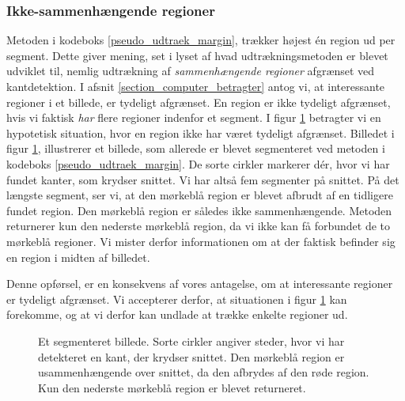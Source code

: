 {\subsubsection{Ikke-sammenhængende regioner}
Metoden i kodeboks \ref{pseudo_udtraek_margin}, trækker højest én region
ud per segment. Dette giver mening, set i lyset af hvad
udtrækningsmetoden er blevet udviklet til, nemlig udtrækning af
\emph{sammenhængende regioner} afgrænset ved kantdetektion. I afsnit
\ref{section_computer_betragter} antog vi, at interessante regioner i et
billede, er tydeligt afgrænset. En region er ikke tydeligt afgrænset,
hvis vi faktisk \emph{har} flere regioner indenfor et segment. I figur
\ref{usammenhaengende_region} betragter vi en hypotetisk situation, hvor
en region ikke har været tydeligt afgrænset. Billedet i figur
\ref{usammenhaengende_region}, illustrerer et billede, som allerede er
blevet segmenteret ved metoden i kodeboks \ref{pseudo_udtraek_margin}.
De sorte cirkler markerer dér, hvor vi har fundet kanter, som krydser
snittet. Vi har altså fem segmenter på snittet. På det længste segment,
ser vi, at den mørkeblå region er blevet afbrudt af en tidligere fundet
region. Den mørkeblå region er således ikke sammenhængende. Metoden
returnerer kun den nederste mørkeblå region, da vi ikke kan få forbundet
de to mørkeblå regioner. Vi mister derfor informationen om at der
faktisk befinder sig en region i midten af billedet.

Denne opførsel, er en konsekvens af vores antagelse, om at interessante
regioner er tydeligt afgrænset. Vi accepterer derfor, at situationen i
figur \ref{usammenhaengende_region} kan forekomme, og at vi derfor kan
undlade at trække enkelte regioner ud.

\begin{figure}[t]
    \setlength\fboxsep{0pt}
    \setlength\fboxrule{0.5pt}
    \centering
    \caption[]{Et segmenteret billede. Sorte cirkler angiver steder,
    hvor vi har detekteret en kant, der krydser snittet. Den mørkeblå
    region er usammenhængende over snittet, da den afbrydes af den røde
    region. Kun den nederste mørkeblå region er blevet returneret.}
    \label{usammenhaengende_region}
\end{figure}

}
